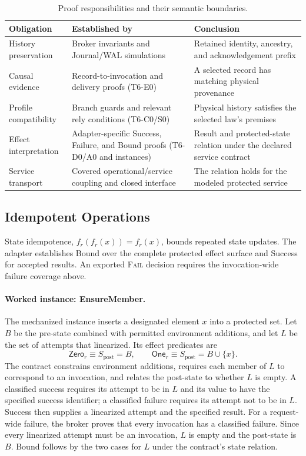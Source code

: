 \documentclass[acmsmall,screen,review,anonymous]{acmart}
\newcommand{\Fail}{\textsc{Fail}\xspace}
\begin{document}
\begin{table}[t]
  \caption{Proof responsibilities and their semantic boundaries.}
  \label{tab:proof-responsibilities}
  \centering
  \small
  \begin{tabularx}{\columnwidth}{@{}lYY@{}}
    \toprule
    \textbf{Obligation} & \textbf{Established by} & \textbf{Conclusion} \\
    \midrule
    History preservation & Broker invariants and Journal/WAL simulations &
      Retained identity, ancestry, and acknowledgement prefix \\
    Causal evidence & Record-to-invocation and delivery proofs (T6-E0) &
      A selected record has matching physical provenance \\
    Profile compatibility & Branch guards and relevant rely conditions
      (T6-C0/S0) & Physical history satisfies the selected law's premises \\
    Effect interpretation & Adapter-specific Success, Failure, and Bound
      proofs (T6-D0/A0 and instances) & Result and protected-state relation
      under the declared service contract \\
    Service transport & Covered operational/service coupling and closed
      interface & The relation holds for the modeled protected service \\
    \bottomrule
  \end{tabularx}
\end{table}

\subsection{Idempotent Operations}

State idempotence, $f_r(f_r(x))=f_r(x)$, bounds repeated state updates.
The adapter establishes Bound over the complete protected effect surface
and Success for accepted results. An exported \Fail decision requires
the invocation-wide failure coverage above.

\paragraph{Worked instance: EnsureMember.}
The mechanized instance inserts a designated element $x$ into a protected
set. Let $B$ be the pre-state combined with permitted environment
additions, and let $L$ be the set of attempts that linearized. Its
effect predicates are
\[
  \mathsf{Zero}_r\equiv S_{\mathrm{post}}=B,
  \qquad
  \mathsf{One}_r\equiv S_{\mathrm{post}}=B\cup\{x\}.
\]
The contract constrains environment additions, requires each member of
$L$ to correspond to an invocation, and relates the post-state to whether
$L$ is empty. A classified success requires its attempt to be in $L$
and its value to have the specified success identifier; a classified
failure requires its attempt not to be in $L$.
Success then supplies a linearized attempt and the specified result.
For a request-wide failure, the broker proves that every invocation has
a classified failure. Since every linearized attempt must be an
invocation, $L$ is empty and the post-state is $B$. Bound follows by
the two cases for $L$ under the contract's state relation.
\end{document}

